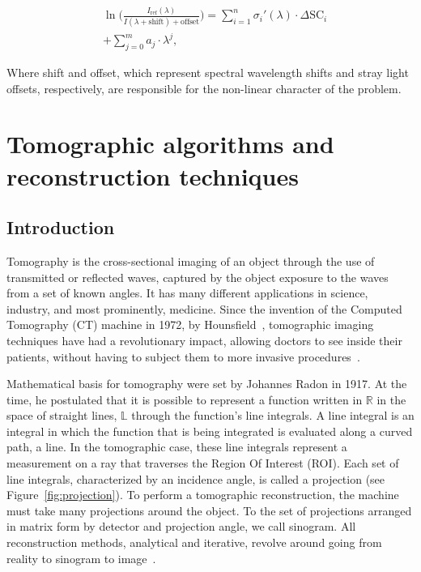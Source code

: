 \begin{align}
      \label{eq:DOAS_nonLinear}
      &\ln\Big( \frac{I_\mathrm{ref}(\lambda)}{I(\lambda + \mathrm{shift}) + \mathrm{offset}} \Big) = \sum_{i = 1}^{n} \sigma_{i}{'}(\lambda) \cdot \Delta \mathrm{SC}_{i} \nonumber\\
      &+ \sum_{j = 0}^{m} a_{j} \cdot \lambda^{j},
\end{align}

Where shift and offset, which represent spectral wavelength shifts and
stray light offsets, respectively, are responsible for the non-linear
character of the problem.


\section{Tomographic algorithms and reconstruction techniques}%
\label{sec:tomographic_algorithms_and_reconstruction_techniques}

\subsection{Introduction}%
\label{sub:introduction}

Tomography is the cross-sectional imaging of an object through the use
of transmitted or reflected waves, captured by the object exposure to
the waves from a set of known angles. It has many different applications
in science, industry, and most prominently, medicine. Since the
invention of the Computed Tomography (\gls{CT}) machine in 1972, by
Hounsfield~\cite{Gunderman2006}, tomographic imaging techniques have had
a revolutionary impact, allowing doctors to see inside their patients,
without having to subject them to more invasive
procedures~\cite{Kak2001}.

Mathematical basis for tomography were set by Johannes Radon in 1917. At
the time, he postulated that  it is possible to represent a function
written in $\mathbb{R}$ in the space of straight lines, $\mathbb{L}$
through the function's line integrals. A line integral is an integral in
which the function that is being integrated is evaluated along a curved
path, a line. In the tomographic case, these line integrals represent a
measurement on a ray that traverses the Region Of Interest (\gls{ROI}).
Each set of line integrals, characterized by an incidence angle, is
called a projection (see Figure~\ref{fig:projection}). To perform a
tomographic reconstruction, the machine must take many projections
around the object. To the set of projections arranged in matrix form by
detector and projection angle, we call sinogram. All reconstruction
methods, analytical and iterative, revolve around going from reality to
sinogram to image~\cite{Bruyant2002, Kak2001, Herman1973, Herman1995,
Herman2009, Defrise2003}.

